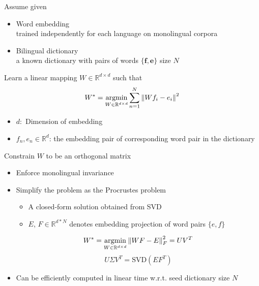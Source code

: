 \documentclass[11pt, a4paper, landscape]{article}
\newcommand*{\argmin}{\ensuremath{\operatornamewithlimits{argmin}}\xspace}
\begin{document}
	
	\vfill	
	\NewPage
	\vfill
	Assume given
	\begin{itemize}
		\item Word embedding \\
		trained  independently for each language on monolingual corpora
		\item Bilingual dictionary \\
		a known dictionary with pairs of words ${ \{ \bm{f}, \bm{e} \} }$ size $N$ 
	\end{itemize}
	
	
	
	Learn a linear mapping ${W \in \mathbb{R}^{d \times d}}$ such that
	\[W^*= \argmin\limits_{W \in \mathbb{R}^{d \times d}} {\sum_{n=1}^{N} {\lVert Wf_i -e_i \rVert}^2} \]
	\begin{itemize}
		\item ${d:}$ Dimension of embedding
		\item $f_n, e_n \in \mathbb{R}^d $: the embedding pair of corresponding word pair in the dictionary
	\end{itemize}
	\vfill
	
	
	
	\NewPage
	\vfill
	Constrain ${W}$ to be an orthogonal matrix
	\begin{itemize}
		\item Enforce monolingual invariance
		
		\item Simplify the problem as the Procrustes problem
		
		\begin{itemize}
			\item A closed-form solution obtained from SVD
			\item $E$, $F \in \mathbb{R}^{d*N}$ denotes embedding projection of word pairs ${\{e,f\}}$
		\end{itemize}
		
		\[ W^* = \argmin\limits_{W \in \mathbb{R}^{d \times d}} {\lVert WF-E\lVert}_F^2  =  UV^T\]
		\[ U\varSigma V^T =  \textrm{SVD}(EF^T)\]
		
		\item Can be efficiently computed in linear time  w.r.t. seed dictionary size $N$
	\end{itemize}
	\vfill
	
\end{document}
